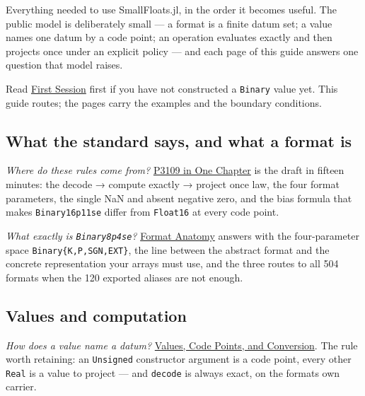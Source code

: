 \label{10272851679537904033}{}


Everything needed to use SmallFloats.jl, in the order it becomes useful. The public model is deliberately small — a format is a finite datum set; a value names one datum by a code point; an operation evaluates exactly and then projects once under an explicit policy — and each page of this guide answers one question that model raises.



Read \href{first\_\allowbreak{}session.md}{First Session} first if you have not constructed a \texttt{Binary} value yet. This guide routes; the pages carry the examples and the boundary conditions.



\subsection{What the standard says, and what a format is}



\label{9233747362202347778}{}


\emph{Where do these rules come from?} \href{concept\_\allowbreak{}p3109.md}{P3109 in One Chapter} is the draft in fifteen minutes: the decode → compute exactly → project once law, the four format parameters, the single NaN and absent negative zero, and the bias formula that makes \texttt{Binary16p11se} differ from \texttt{Float16} at every code point.



\emph{What exactly is \texttt{Binary8p4se}?} \href{concept\_\allowbreak{}format\_\allowbreak{}anatomy.md}{Format Anatomy} answers with the four-parameter space \texttt{Binary\{K,P,SGN,EXT\}}, the line between the abstract format and the concrete representation your arrays must use, and the three routes to all 504 formats when the 120 exported aliases are not enough.



\subsection{Values and computation}



\label{9903589781054288482}{}


\emph{How does a value name a datum?} \href{concept\_\allowbreak{}values\_\allowbreak{}codepoints.md}{Values, Code Points, and Conversion}. The rule worth retaining: an \texttt{Unsigned} constructor argument is a code point, every other \texttt{Real} is a value to project — and \texttt{decode} is always exact, on the format{\textquotesingle}s own carrier.



